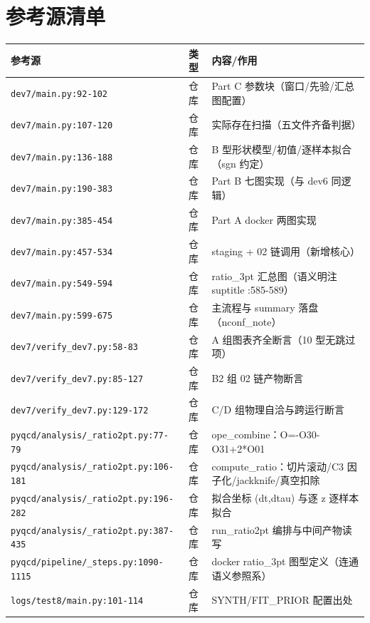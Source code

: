 \documentclass[UTF8]{ctexart}
\begin{document}
\section{参考源清单}
\begin{xltabular}{\textwidth}{llX}
\toprule
\textcolor{evidence}{参考源} & 类型 & 内容/作用 \\
\midrule
\endhead
\texttt{\nolinkurl{dev7/main.py:92-102}} & 仓库 & Part C 参数块（窗口/先验/汇总图配置） \\
\texttt{\nolinkurl{dev7/main.py:107-120}} & 仓库 & 实际存在扫描（五文件齐备判据） \\
\texttt{\nolinkurl{dev7/main.py:136-188}} & 仓库 & B 型形状模型/初值/逐样本拟合（sgn 约定） \\
\texttt{\nolinkurl{dev7/main.py:190-383}} & 仓库 & Part B 七图实现（与 dev6 同逻辑） \\
\texttt{\nolinkurl{dev7/main.py:385-454}} & 仓库 & Part A docker 两图实现 \\
\texttt{\nolinkurl{dev7/main.py:457-534}} & 仓库 & staging + 02 链调用（新增核心） \\
\texttt{\nolinkurl{dev7/main.py:549-594}} & 仓库 & ratio\_3pt 汇总图（语义明注 suptitle :585-589） \\
\texttt{\nolinkurl{dev7/main.py:599-675}} & 仓库 & 主流程与 summary 落盘（nconf\_note） \\
\texttt{\nolinkurl{dev7/verify\_dev7.py:58-83}} & 仓库 & A 组图表齐全断言（10 型无跳过项） \\
\texttt{\nolinkurl{dev7/verify\_dev7.py:85-127}} & 仓库 & B2 组 02 链产物断言 \\
\texttt{\nolinkurl{dev7/verify\_dev7.py:129-172}} & 仓库 & C/D 组物理自洽与跨运行断言 \\
\texttt{\nolinkurl{pyqcd/analysis/\_ratio2pt.py:77-79}} & 仓库 & ope\_combine：O=-O30-O31+2*O01 \\
\texttt{\nolinkurl{pyqcd/analysis/\_ratio2pt.py:106-181}} & 仓库 & compute\_ratio：切片滚动/C3 因子化/jackknife/真空扣除 \\
\texttt{\nolinkurl{pyqcd/analysis/\_ratio2pt.py:196-282}} & 仓库 & 拟合坐标 (dt,dtau) 与逐 z 逐样本拟合 \\
\texttt{\nolinkurl{pyqcd/analysis/\_ratio2pt.py:387-435}} & 仓库 & run\_ratio2pt 编排与中间产物读写 \\
\texttt{\nolinkurl{pyqcd/pipeline/\_steps.py:1090-1115}} & 仓库 & docker ratio\_3pt 图型定义（连通语义参照系） \\
\texttt{\nolinkurl{logs/test8/main.py:101-114}} & 仓库 & SYNTH/FIT\_PRIOR 配置出处 \\

\end{xltabular}
\end{document}
